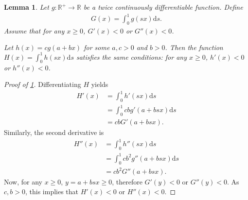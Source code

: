 \documentclass[a4paper]{article}
\newtheorem{lemma}{Lemma}
\newcommand{\ds}{\mathrm{d}s}
\begin{document}
\begin{lemma}
    \label{lem:single_crossing_affine_transformation}
    Let $g: \mathbb{R}^+ \to \mathbb{R}$ be a twice continuously differentiable function.
    Define
    \begin{align*}
        G(x) = \int_0^1 g(sx) \ds.
    \end{align*}
    Assume that for any $x \geq 0$, $G'(x) < 0$ or $G''(x) < 0$.

    Let $h(x) = c g(a + bx)$ for some $a, c > 0$ and $b > 0$.
    Then the function $H(x) = \int_0^1 h(sx) \ds$ satisfies the same conditions: for any $x \geq 0$, $h'(x) < 0$ or $h''(x) < 0$.
\end{lemma}
\begin{proof}[Proof of \cref{lem:single_crossing_affine_transformation}]
    Differentiating $H$ yields
    \begin{align*}
        H'(x) &= \int_0^1 h'(sx) \ds \\
              &= \int_0^1 c b g'(a + bsx) \ds \\
              &= c b G'(a + bsx).
    \end{align*}
    Similarly, the second derivative is
    \begin{align*}
        H''(x) &= \int_0^1 h''(sx) \ds \\
               &= \int_0^1 c b^2 g''(a + bsx) \ds \\
               &= c b^2 G''(a + bsx).
    \end{align*}
    Now, for any $x \geq 0$, $y = a + bsx \geq 0$, therefore $G'(y) < 0$ or $G''(y) < 0$.
    As $c, b > 0$, this implies that $H'(x) < 0$ or $H''(x) < 0$.
\end{proof}
\end{document}
